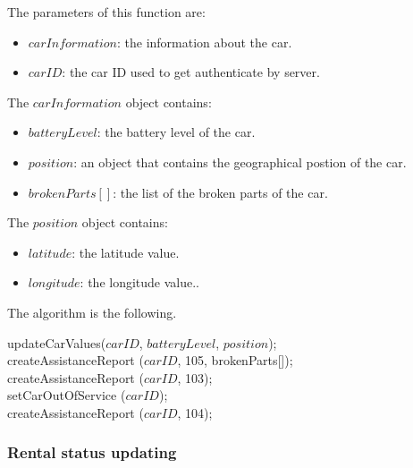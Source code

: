 The parameters of this function are:
\begin{itemize}
	\item $carInformation$: the information about the car.
	\item $carID$: the car ID used to get authenticate by server.
\end{itemize}
The $carInformation$ object contains:
\begin{itemize}
	\item $batteryLevel$: the battery level of the car.
	\item $position$: an object that contains the geographical postion of the car.
	\item $brokenParts[]$: the list of the broken parts of the car.
\end{itemize}
The $position$ object contains:
\begin{itemize}
	\item $latitude$: the latitude value.
	\item $longitude$: the longitude value..
\end{itemize}
The algorithm is the following.

\bigskip

\begin{algorithm}[H]
\small
	{\color{blue} updateCarValues}($carID$, $batteryLevel$, $position$); \\ 
	{
		{
			{\color{blue} createAssistanceReport} ($carID$, {\color{red}105}, brokenParts[]); \\
		} 
	}
	{
		{
			{\color{blue}createAssistanceReport} ($carID$, {\color{red}103}); \\
		} 
	}
	{
		{
			{
				{\color{blue} setCarOutOfService} ($carID$); \\
				{\color{blue} createAssistanceReport} ($carID$, {\color{red}104}); \\
			} 
		}
	}
\end{algorithm}

\subsubsection{Rental status updating}

